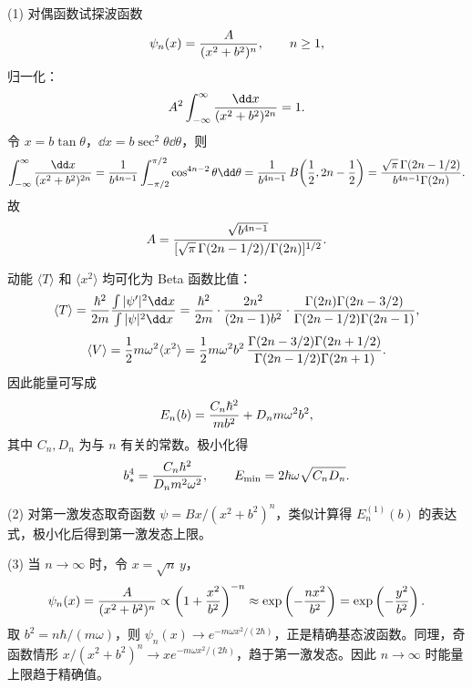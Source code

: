 \begin{solution}
(1) 对偶函数试探波函数
\[
\psi_n(x)={A\over(x^2+b^2)^n},\qquad n\ge1,
\]
归一化：
\[
A^2\int_{-\infty}^\infty{\dd x\over(x^2+b^2)^{2n}}=1.
\]
令 $x=b\tan\theta$，$\dd x=b\sec^2\theta\dd\theta$，则
\[
\int_{-\infty}^\infty{\dd x\over(x^2+b^2)^{2n}}
={1\over b^{4n-1}}\int_{-\pi/2}^{\pi/2}\cos^{4n-2}\theta\dd\theta
={1\over b^{4n-1}}\,B\!\left({1\over2},2n-{1\over2}\right)
={\sqrt\pi\,\Gamma(2n-1/2)\over b^{4n-1}\Gamma(2n)}.
\]
故
\[
A={\sqrt{b^{4n-1}}\over[\sqrt\pi\,\Gamma(2n-1/2)/\Gamma(2n)]^{1/2}}.
\]

动能 $\langle T\rangle$ 和 $\langle x^2\rangle$ 均可化为 Beta 函数比值：
\[
\langle T\rangle={\hbar^2\over2m}{\int|\psi'|^2\dd x\over\int|\psi|^2\dd x}
={\hbar^2\over2m}\cdot{2n^2\over(2n-1)b^2}\cdot{\Gamma(2n)\Gamma(2n-3/2)\over\Gamma(2n-1/2)\Gamma(2n-1)},
\]
\[
\langle V\rangle={1\over2}m\omega^2\langle x^2\rangle
={1\over2}m\omega^2b^2\,{\Gamma(2n-3/2)\Gamma(2n+1/2)\over\Gamma(2n-1/2)\Gamma(2n+1)}.
\]
因此能量可写成
\[
E_n(b)={C_n\hbar^2\over mb^2}+D_n m\omega^2 b^2,
\]
其中 $C_n,D_n$ 为与 $n$ 有关的常数。极小化得
\[
b_*^4={C_n\hbar^2\over D_n m^2\omega^2},\qquad
E_{\min}=2\hbar\omega\sqrt{C_nD_n}.
\]

(2) 对第一激发态取奇函数 $\psi=Bx/(x^2+b^2)^n$，类似计算得 $E_n^{(1)}(b)$ 的表达式，极小化后得到第一激发态上限。

(3) 当 $n\to\infty$ 时，令 $x=\sqrt{n}\,y$，
\[
\psi_n(x)={A\over(x^2+b^2)^n}
\propto\left(1+{x^2\over b^2}\right)^{-n}
\approx\exp\left(-{n x^2\over b^2}\right)
=\exp\left(-{y^2\over b^2}\right).
\]
取 $b^2=n\hbar/(m\omega)$，则 $\psi_n(x)\to e^{-m\omega x^2/(2\hbar)}$，正是精确基态波函数。同理，奇函数情形 $x/(x^2+b^2)^n\to x e^{-m\omega x^2/(2\hbar)}$，趋于第一激发态。因此 $n\to\infty$ 时能量上限趋于精确值。
\end{solution}

